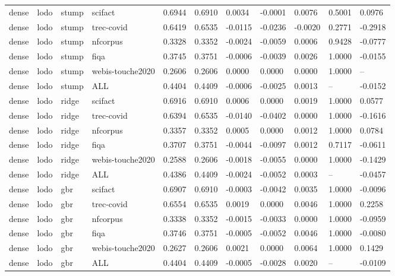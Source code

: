 \begin{table}[t]
\begin{tabular}{lllllllllll}
dense & lodo & stump & scifact & 0.6944 & 0.6910 & 0.0034 & -0.0001 & 0.0076 & 0.5001 & 0.0976 \\
dense & lodo & stump & trec-covid & 0.6419 & 0.6535 & -0.0115 & -0.0236 & -0.0020 & 0.2771 & -0.2918 \\
dense & lodo & stump & nfcorpus & 0.3328 & 0.3352 & -0.0024 & -0.0059 & 0.0006 & 0.9428 & -0.0777 \\
dense & lodo & stump & fiqa & 0.3745 & 0.3751 & -0.0006 & -0.0039 & 0.0026 & 1.0000 & -0.0155 \\
dense & lodo & stump & webis-touche2020 & 0.2606 & 0.2606 & 0.0000 & 0.0000 & 0.0000 & 1.0000 & -- \\
dense & lodo & stump & ALL & 0.4404 & 0.4409 & -0.0006 & -0.0025 & 0.0013 & -- & -0.0152 \\
dense & lodo & ridge & scifact & 0.6916 & 0.6910 & 0.0006 & 0.0000 & 0.0019 & 1.0000 & 0.0577 \\
dense & lodo & ridge & trec-covid & 0.6394 & 0.6535 & -0.0140 & -0.0402 & 0.0000 & 1.0000 & -0.1616 \\
dense & lodo & ridge & nfcorpus & 0.3357 & 0.3352 & 0.0005 & 0.0000 & 0.0012 & 1.0000 & 0.0784 \\
dense & lodo & ridge & fiqa & 0.3707 & 0.3751 & -0.0044 & -0.0097 & 0.0012 & 0.7117 & -0.0611 \\
dense & lodo & ridge & webis-touche2020 & 0.2588 & 0.2606 & -0.0018 & -0.0055 & 0.0000 & 1.0000 & -0.1429 \\
dense & lodo & ridge & ALL & 0.4386 & 0.4409 & -0.0024 & -0.0052 & 0.0003 & -- & -0.0457 \\
dense & lodo & gbr & scifact & 0.6907 & 0.6910 & -0.0003 & -0.0042 & 0.0035 & 1.0000 & -0.0096 \\
dense & lodo & gbr & trec-covid & 0.6554 & 0.6535 & 0.0019 & 0.0000 & 0.0046 & 1.0000 & 0.2258 \\
dense & lodo & gbr & nfcorpus & 0.3338 & 0.3352 & -0.0015 & -0.0033 & 0.0000 & 1.0000 & -0.0959 \\
dense & lodo & gbr & fiqa & 0.3746 & 0.3751 & -0.0005 & -0.0052 & 0.0046 & 1.0000 & -0.0080 \\
dense & lodo & gbr & webis-touche2020 & 0.2627 & 0.2606 & 0.0021 & 0.0000 & 0.0064 & 1.0000 & 0.1429 \\
dense & lodo & gbr & ALL & 0.4404 & 0.4409 & -0.0005 & -0.0028 & 0.0020 & -- & -0.0109 \\
\bottomrule
\end{tabular}
\end{table}
